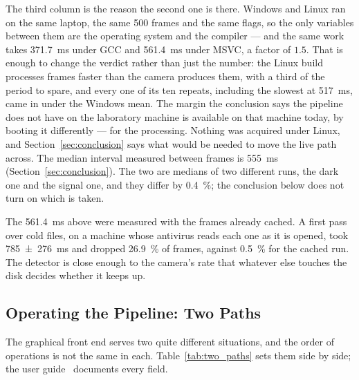 \documentclass[a4paper,headsepline,oneside,11pt]{scrartcl}
\begin{document}
The third column is the reason the second one is there. Windows and Linux ran on
the same laptop, the same 500 frames and the same flags, so the only variables
between them are the operating system and the compiler --- and the same work
takes \SI{371.7}{\milli\second} under GCC and \SI{561.4}{\milli\second} under
MSVC, a factor of $1.5$. That is enough to change the verdict rather than just
the number: the Linux build processes frames faster than the camera produces
them, with a third of the period to spare, and every one of its ten repeats,
including the slowest at \SI{517}{\milli\second}, came in under the Windows
mean. The margin the conclusion says the pipeline does not have on the
laboratory machine is available on that machine today, by booting it
differently --- for the processing. Nothing was acquired under Linux, and
Section~\ref{sec:conclusion} says what would be needed to move the live path
across. The median interval measured between frames is
\SI{555}{\milli\second} (Section~\ref{sec:conclusion}). The two are medians of two different
runs, the dark one and the signal one, and they differ by \SI{0.4}{\percent}; the
conclusion below does not turn on which is taken.

The \SI{561.4}{\milli\second} above were measured with the frames already cached.
A first pass over cold files, on a machine whose antivirus reads each one as it
is opened, took \SI{785(276)}{\milli\second} and dropped \SI{26.9}{\percent} of frames, against
\SI{0.5}{\percent} for the cached run. The detector is close enough to the camera's rate
that whatever else touches the disk decides whether it keeps up.

\subsection{Operating the Pipeline: Two Paths}
\label{sec:operating}

The graphical front end serves two quite different situations, and the order of
operations is not the same in each. Table~\ref{tab:two_paths} sets them side by
side; the user guide~\cite{UserGuide} documents every field.
\end{document}
